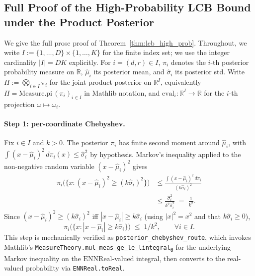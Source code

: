 \documentclass[opre,dblanonrev]{informs4}
\begin{document}
\begin{APPENDICES}
\section{Full Proof of the High-Probability LCB Bound under the Product Posterior}
\label{app:high_prob_proof}

We give the full prose proof of Theorem~\ref{thm:lcb_high_prob}.
Throughout, we write $I := \{1,\ldots,D\} \times \{1,\ldots,K\}$ for
the finite index set; we use the integer cardinality $|I| = DK$
explicitly. For $i = (d,r) \in I$, $\pi_i$ denotes the $i$-th
posterior probability measure on $\mathbb{R}$, $\hat\mu_i$ its
posterior mean, and $\hat\sigma_i$ its posterior std. Write
$\Pi := \bigotimes_{i \in I} \pi_i$ for the joint product
posterior on $\mathbb{R}^I$, equivalently
$\Pi = \mathrm{Measure.pi}\,(\pi_i)_{i \in I}$ in Mathlib notation,
and $\mathrm{eval}_i : \mathbb{R}^I \to \mathbb{R}$ for the $i$-th
projection $\omega \mapsto \omega_i$.

\paragraph{Step 1: per-coordinate Chebyshev.}
Fix $i \in I$ and $k > 0$. The posterior $\pi_i$ has finite second
moment around $\hat\mu_i$, with $\int (x - \hat\mu_i)^2\,d\pi_i(x)
\leq \hat\sigma_i^2$ by hypothesis. Markov's inequality applied to
the non-negative random variable $(x - \hat\mu_i)^2$ gives
\begin{align*}
\pi_i\bigl(\{x : (x - \hat\mu_i)^2 \geq (k\hat\sigma_i)^2\}\bigr)
  &\leq \frac{\int (x - \hat\mu_i)^2 \, d\pi_i}{(k\hat\sigma_i)^2} \\
  &\leq \frac{\hat\sigma_i^2}{k^2 \hat\sigma_i^2}
  \;=\; \frac{1}{k^2}.
\end{align*}
Since $(x - \hat\mu_i)^2 \geq (k\hat\sigma_i)^2$ iff
$|x - \hat\mu_i| \geq k\hat\sigma_i$ (using
$|x|^2 = x^2$ and that $k\hat\sigma_i \geq 0$),
\begin{equation}
\pi_i\bigl(\{x : |x - \hat\mu_i| \geq k\hat\sigma_i\}\bigr)
\;\leq\; 1/k^2,\qquad \forall i \in I.
\label{eq:per_coord_chebyshev}
\end{equation}
This step is mechanically verified as
\texttt{posterior\_chebyshev\_route}, which invokes Mathlib's
\texttt{MeasureTheory.\allowbreak mul\_meas\_ge\_le\_lintegral\textsubscript{0}} for the
underlying Markov inequality on the $\mathrm{ENNReal}$-valued
integral, then converts to the real-valued probability via
\texttt{ENNReal.toReal}.


\end{APPENDICES}
\end{document}
